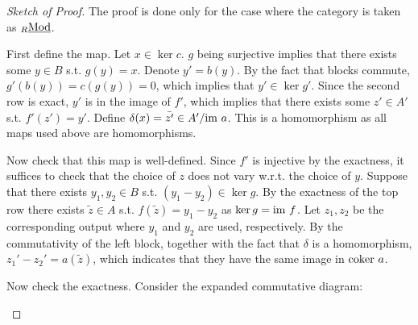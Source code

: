 \documentclass{article}
\begin{document}
\begin{proof}[Sketch of Proof]
    The proof is done only for the case where the category is taken as ${}_{R}\underline{\textup{Mod}}$.

    First define the map. Let $x \in \ker c$. $g$ being surjective implies that there exists some $y \in B$ s.t. $g(y) = x$. Denote $y' = b(y)$. By the fact that blocks commute, $g'(b(y)) = c(g(y)) = 0$, which implies that $y' \in \ker g'$. Since the second row is exact, $y'$ is in the image of $f'$, which implies that there exists some $z' \in A'$ s.t. $f'(z') = y'$. Define $\delta(x) = \bar{z'} \in A' / \mathrm{im}\  a$. This is a homomorphism as all maps used above are homomorphisms.

    Now check that this map is well-defined. Since $f'$ is injective by the exactness, it suffices to check that the choice of $z$ does not vary w.r.t. the choice of $y$. Suppose that there exists $y_1, y_2 \in B$ s.t. $(y_1 - y_2) \in \ker g$. By the exactness of the top row there exists $\tilde{z} \in A$ s.t. $f(\tilde{z}) = y_1 - y_2$ as $\ker g = \mathrm{im}\  f$. Let $z_1, z_2$ be the corresponding output where $y_1$ and $y_2$ are used, respectively. By the commutativity of the left block, together with the fact that $\delta$ is a homomorphism, $z_1' - z_2' = a(\tilde{z})$, which indicates that they have the same image in $\mathrm{coker}\  a$.

    Now check the exactness. Consider the expanded commutative diagram:
    \begin{figure}[htbp]
        \centering
    \end{figure}


\end{proof}
\end{document}
